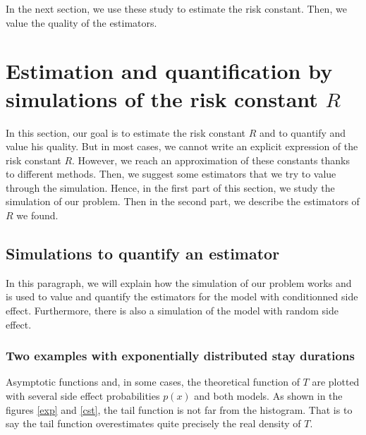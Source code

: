 \documentclass[12pt,twoside]{article}
\begin{document}
In the next section, we use these study to estimate the risk constant. Then, we value the quality of the estimators.


\clearpage

\section{Estimation and quantification by simulations of the risk constant $R$}
\label{result}
In this section, our goal is to estimate the risk constant $R$ and to quantify and value his quality.
But in most cases, we cannot write an explicit expression of the risk constant $R$. 
However, we  reach an approximation of these constants thanks to different methods. 
Then, we suggest some estimators that we try to value through the simulation. Hence, in the
first part of this section, we study the simulation of our problem. Then in the second part, 
we describe the estimators of $R$ we found.




\subsection{Simulations to quantify an estimator}
In this paragraph, we will explain how the simulation of our problem works and is used to value and quantify the estimators for the model with conditionned side effect. Furthermore, there is also
a simulation of the model with random side effect.




\subsubsection{Two examples with exponentially distributed stay durations }


Asymptotic functions and, in some cases, the theoretical function of $T$ 
are plotted with several side effect probabilities $p(x)$ and both models.  
As shown in the figures \ref{exp} 
and \ref{cst}, the tail function is not
far from the histogram. That is to say the tail function overestimates quite precisely the real density of $T$.
\end{document}
